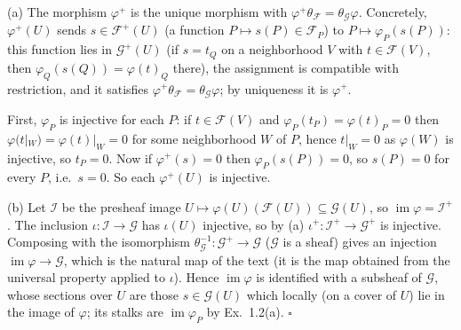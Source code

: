 \documentclass[11pt]{article}
\begin{document}
\pf
(a) The morphism $\varphi^+$ is the unique morphism with $\varphi^+\theta_{\mathcal F}=\theta_{\mathcal G}\varphi$. Concretely, $\varphi^+(U)$ sends $s\in\mathcal F^+(U)$ (a function $P\mapsto s(P)\in\mathcal F_P$) to $P\mapsto\varphi_P(s(P))$: this function lies in $\mathcal G^+(U)$ (if $s=t_Q$ on a neighborhood $V$ with $t\in\mathcal F(V)$, then $\varphi_Q(s(Q))=\varphi(t)_Q$ there), the assignment is compatible with restriction, and it satisfies $\varphi^+\theta_{\mathcal F}=\theta_{\mathcal G}\varphi$; by uniqueness it is $\varphi^+$.

First, $\varphi_P$ is injective for each $P$: if $t\in\mathcal F(V)$ and $\varphi_P(t_P)=\varphi(t)_P=0$ then $\varphi(t|_W)=\varphi(t)|_W=0$ for some neighborhood $W$ of $P$, hence $t|_W=0$ as $\varphi(W)$ is injective, so $t_P=0$. Now if $\varphi^+(s)=0$ then $\varphi_P(s(P))=0$, so $s(P)=0$ for every $P$, i.e.\ $s=0$. So each $\varphi^+(U)$ is injective.

(b) Let $\mathcal I$ be the presheaf image $U\mapsto\varphi(U)(\mathcal F(U))\subseteq\mathcal G(U)$, so $\operatorname{im}\varphi=\mathcal I^+$. The inclusion $\iota\colon\mathcal I\to\mathcal G$ has $\iota(U)$ injective, so by (a) $\iota^+\colon\mathcal I^+\to\mathcal G^+$ is injective. Composing with the isomorphism $\theta_{\mathcal G}^{-1}\colon\mathcal G^+\to\mathcal G$ ($\mathcal G$ is a sheaf) gives an injection $\operatorname{im}\varphi\to\mathcal G$, which is the natural map of the text (it is the map obtained from the universal property applied to $\iota$). Hence $\operatorname{im}\varphi$ is identified with a subsheaf of $\mathcal G$, whose sections over $U$ are those $s\in\mathcal G(U)$ which locally (on a cover of $U$) lie in the image of $\varphi$; its stalks are $\operatorname{im}\varphi_P$ by Ex.~1.2(a). \hfill$\square$
\end{document}
